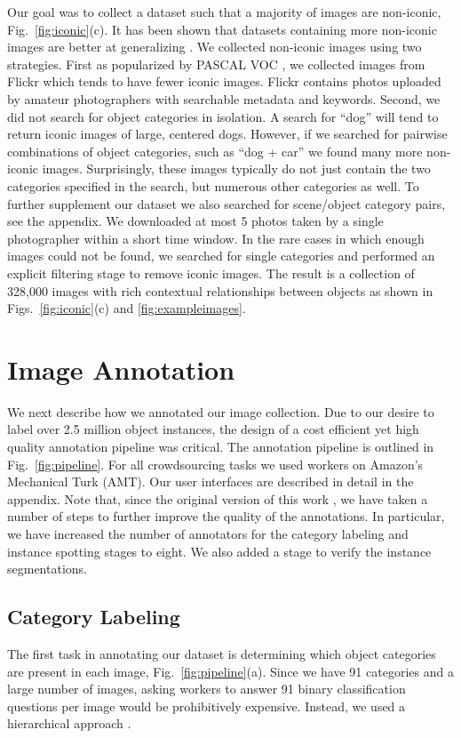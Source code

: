 Our goal was to collect a dataset such that a majority of images are non-iconic, Fig.~\ref{fig:iconic}(c). It has been shown that datasets containing more non-iconic images are better at generalizing \cite{torralba2011unbiased}. We collected non-iconic images using two strategies. First as popularized by PASCAL VOC \cite{PASCAL}, we collected images from Flickr which tends to have fewer iconic images. Flickr contains photos uploaded by amateur photographers with searchable metadata and keywords. Second, we did not search for object categories in isolation. A search for ``dog'' will tend to return iconic images of large, centered dogs. However, if we searched for pairwise combinations of object categories, such as ``dog + car'' we found many more non-iconic images. Surprisingly, these images typically do not just contain the two categories specified in the search, but numerous other categories as well. To further supplement our dataset we also searched for scene/object category pairs, see the appendix. We downloaded at most 5 photos taken by a single photographer within a short time window. In the rare cases in which enough images could not be found, we searched for single categories and performed an explicit filtering stage to remove iconic images. The result is a collection of 328,000 images with rich contextual relationships between objects as shown in Figs.~\ref{fig:iconic}(c) and \ref{fig:exampleimages}.

\section{Image Annotation}

We next describe how we annotated our image collection. Due to our desire to label over 2.5 million object instances, the design of a cost efficient yet high quality annotation pipeline was critical. The annotation pipeline is outlined in Fig.~\ref{fig:pipeline}. For all crowdsourcing tasks we used workers on Amazon's Mechanical Turk (AMT). Our user interfaces are described in detail in the appendix. Note that, since the original version of this work \cite{eccv}, we have taken a number of steps to further improve the quality of the annotations. In particular, we have increased the number of annotators for the category labeling and instance spotting stages to eight. We also added a stage to verify the instance segmentations.

\subsection{Category Labeling}\label{sec:category-labeling} The first task in annotating our dataset is determining which object categories are present in each image, Fig.~\ref{fig:pipeline}(a). Since we have 91 categories and a large number of images, asking workers to answer 91 binary classification questions per image would be prohibitively expensive. Instead, we used a hierarchical approach \cite{Olga}.

